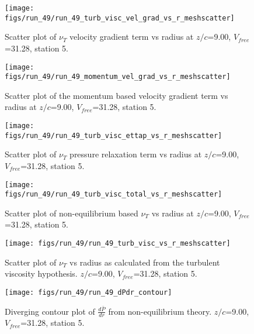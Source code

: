 \begin{figure}[H]
\centering
\texttt{[image: figs/run\_49/run\_49\_turb\_visc\_vel\_grad\_vs\_r\_meshscatter]}
\caption{Scatter plot of $\nu_T$ velocity gradient term vs radius at $z/c$=9.00, $V_{free}$=31.28, station 5.}
\end{figure}


\begin{figure}[H]
\centering
\texttt{[image: figs/run\_49/run\_49\_momentum\_vel\_grad\_vs\_r\_meshscatter]}
\caption{Scatter plot of the momentum based velocity gradient term vs radius at $z/c$=9.00, $V_{free}$=31.28, station 5.}
\end{figure}


\begin{figure}[H]
\centering
\texttt{[image: figs/run\_49/run\_49\_turb\_visc\_ettap\_vs\_r\_meshscatter]}
\caption{Scatter plot of $\nu_T$ pressure relaxation term vs radius at $z/c$=9.00, $V_{free}$=31.28, station 5.}
\end{figure}


\begin{figure}[H]
\centering
\texttt{[image: figs/run\_49/run\_49\_turb\_visc\_total\_vs\_r\_meshscatter]}
\caption{Scatter plot of non-equilibrium based $\nu_T$ vs radius at $z/c$=9.00, $V_{free}$=31.28, station 5.}
\end{figure}


\begin{figure}[H]
\centering
\texttt{[image: figs/run\_49/run\_49\_turb\_visc\_vs\_r\_meshscatter]}
\caption{Scatter plot of $\nu_T$ vs radius as calculated from the turbulent viscosity hypothesis. $z/c$=9.00, $V_{free}$=31.28, station 5.}
\end{figure}


\begin{figure}[H]
\centering
\texttt{[image: figs/run\_49/run\_49\_dPdr\_contour]}
\caption{Diverging contour plot of $\frac{d\bar{P}}{dr}$ from non-equilibrium theory. $z/c$=9.00, $V_{free}$=31.28, station 5.}
\end{figure}


